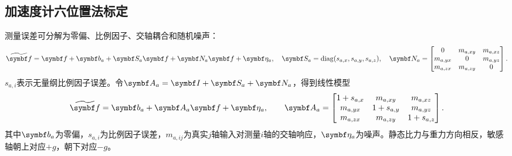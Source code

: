 \subsection{加速度计六位置法标定}
测量误差可分解为零偏、比例因子、交轴耦合和随机噪声：
\begin{equation}
\widetilde{\matr f}=\matr f+\matr b_a+\matr S_a\matr f+\matr N_a\matr f+\matr\eta_a,\quad
\matr S_a=\operatorname{diag}(s_{a,x},s_{a,y},s_{a,z}),\quad
\matr N_a=\begin{bmatrix}0&m_{a,xy}&m_{a,xz}\\m_{a,yx}&0&m_{a,yz}\\m_{a,zx}&m_{a,zy}&0\end{bmatrix}.
\label{eq:accfull}\end{equation}
$s_{a,i}$表示无量纲比例因子误差。令$\matr A_a=\matr I+\matr S_a+\matr N_a$，得到线性模型
\begin{equation}
\widetilde{\matr f}=\matr b_a+\matr A_a\matr f+\matr\eta_a,\qquad
\matr A_a=\begin{bmatrix}
1+s_{a,x}&m_{a,xy}&m_{a,xz}\\m_{a,yx}&1+s_{a,y}&m_{a,yz}\\m_{a,zx}&m_{a,zy}&1+s_{a,z}
\end{bmatrix}.
\label{eq:accmodel}\end{equation}
其中$\matr b_a$为零偏，$s_{a,i}$为比例因子误差，$m_{a,ij}$为真实$j$轴输入对测量$i$轴的交轴响应，$\matr\eta_a$为噪声。静态比力与重力方向相反，敏感轴朝上对应$+g$，朝下对应$-g$。

